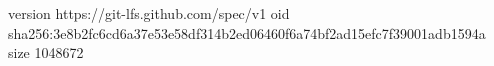 version https://git-lfs.github.com/spec/v1
oid sha256:3e8b2fc6cd6a37e53e58df314b2ed06460f6a74bf2ad15efc7f39001adb1594a
size 1048672
